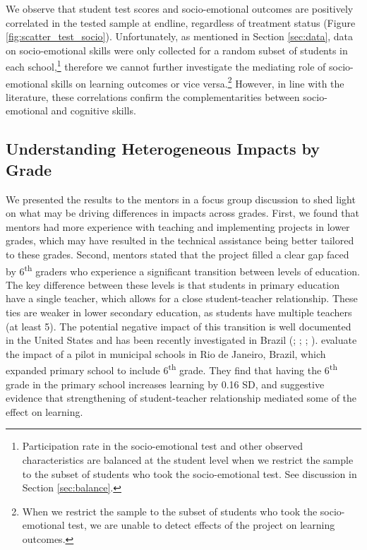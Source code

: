\documentclass[11pt,a4paper]{article}
\begin{document}
We observe that student test scores and socio-emotional outcomes are positively correlated in the tested sample at endline, regardless of treatment status (Figure \ref{fig:scatter_test_socio}). Unfortunately, as mentioned in Section \ref{sec:data}, data on socio-emotional skills were only collected for a random subset of students in each school,\footnote{Participation rate in the socio-emotional test and other observed characteristics are balanced at the student level when we restrict the sample to the subset of students who took the socio-emotional test. See discussion in Section \ref{sec:balance}.} therefore we cannot further investigate the mediating role of socio-emotional skills on learning outcomes or vice versa.\footnote{When we restrict the sample to the subset of students who took the socio-emotional test, we are unable to detect effects of the project on learning outcomes.} However, in line with the literature, these correlations confirm the complementarities between socio-emotional and cognitive skills. 

\subsection{Understanding Heterogeneous Impacts by Grade}

We presented the results to the mentors in a focus group discussion to shed light on what may be driving differences in impacts across grades. First, we found that mentors had more experience with teaching and implementing projects in lower grades, which may have resulted in the technical assistance being better tailored to these grades. Second, mentors stated that the project filled a clear gap faced by 6\textsuperscript{th} graders who experience a significant transition between levels of education. The key difference between these levels is that students in primary education have a single teacher, which allows for a close student-teacher relationship. These ties are weaker in lower secondary education, as students have multiple teachers (at least 5). The potential negative impact of this transition is well documented in the United States and has been recently investigated in Brazil (\citealp{bedard2005middle}; \citealp{cook2006should}; \citealp{hanewald2013transition}; \citealp{Santos2017}). \cite{Santos2017} evaluate the impact of a pilot in municipal schools in Rio de Janeiro, Brazil, which expanded primary school to include  6\textsuperscript{th} grade. They find that having the 6\textsuperscript{th} grade in the primary school increases learning by 0.16 SD, and suggestive evidence that strengthening of student-teacher relationship mediated some of the effect on learning.  
\end{document}
